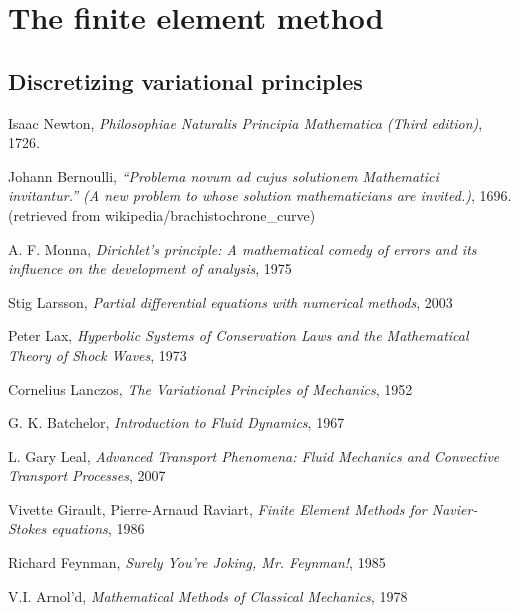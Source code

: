 \documentclass[11pt,a4paper]{memoir}
\begin{document}
\chapter{The finite element method}
\section{Discretizing variational principles}


\begin{thebibliography}{9}

Isaac Newton, \textit{Philosophiae Naturalis Principia Mathematica (Third edition)}, 1726.

Johann Bernoulli, \textit{``Problema novum ad cujus solutionem Mathematici invitantur.'' (A new problem to whose solution mathematicians are invited.)}, 1696.
(retrieved from wikipedia/brachistochrone\_curve)

A. F. Monna, \textit{Dirichlet's principle: A mathematical comedy of errors and its influence on the development of analysis}, 1975

Stig Larsson, \textit{Partial differential equations with numerical methods}, 2003

Peter Lax, \textit{Hyperbolic Systems of Conservation Laws and the Mathematical Theory of Shock Waves}, 1973

Cornelius Lanczos, \textit{The Variational Principles of Mechanics}, 1952

G. K. Batchelor, \textit{Introduction to Fluid Dynamics}, 1967

L. Gary Leal, \textit{Advanced Transport Phenomena: Fluid Mechanics and Convective Transport Processes}, 2007

Vivette Girault, Pierre-Arnaud Raviart, \textit{Finite Element Methods for Navier-Stokes equations}, 1986

Richard Feynman, \textit{Surely You're Joking, Mr. Feynman!}, 1985

V.I. Arnol'd, \textit{Mathematical Methods of Classical Mechanics}, 1978

\end{thebibliography}
\end{document}
